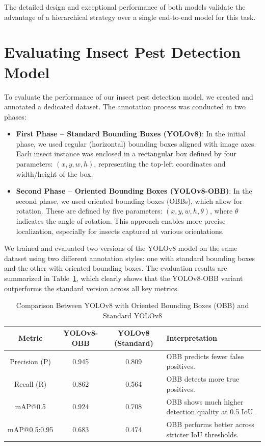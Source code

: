 The detailed design and exceptional performance of both models validate the advantage of a hierarchical strategy over a single end-to-end model for this task.

\section{Evaluating Insect Pest Detection Model}

To evaluate the performance of our insect pest detection model, we created and annotated a dedicated dataset. The annotation process was conducted in two phases:

\begin{itemize}
    \item \textbf{First Phase – Standard Bounding Boxes (YOLOv8)}: In the initial phase, we used regular (horizontal) bounding boxes aligned with image axes. Each insect instance was enclosed in a rectangular box defined by four parameters: $(x, y, w, h)$, representing the top-left coordinates and width/height of the box.
    
    \item \textbf{Second Phase – Oriented Bounding Boxes (YOLOv8-OBB)}: In the second phase, we used oriented bounding boxes (OBBs), which allow for rotation. These are defined by five parameters: $(x, y, w, h, \theta)$, where $\theta$ indicates the angle of rotation. This approach enables more precise localization, especially for insects captured at various orientations.
\end{itemize}

We trained and evaluated two versions of the YOLOv8 model on the same dataset using two different annotation styles: one with standard bounding boxes and the other with oriented bounding boxes. The evaluation results are summarized in Table~\ref{tab:yolo_comparison}, which clearly shows that the YOLOv8-OBB variant outperforms the standard version across all key metrics.
\begin{table}[H]
\centering
\renewcommand{\arraystretch}{1.5}
\setlength{\tabcolsep}{8pt}
\caption{Comparison Between YOLOv8 with Oriented Bounding Boxes (OBB) and Standard YOLOv8}
\begin{tabular}{|c|c|c|p{6cm}|}
\hline
\textbf{Metric} & \textbf{YOLOv8-OBB} & \textbf{YOLOv8 (Standard)} & \textbf{Interpretation} \\
\hline
Precision (P) & 0.945 & 0.809 & OBB predicts fewer false positives. \\
\hline
Recall (R) & 0.862 & 0.564 & OBB detects more true positives. \\
\hline
mAP@0.5 & 0.924 & 0.708 & OBB shows much higher detection quality at 0.5 IoU. \\
\hline
mAP@0.5:0.95 & 0.683 & 0.474 & OBB performs better across stricter IoU thresholds. \\
\hline
\end{tabular}
\label{tab:yolo_comparison}
\end{table}


